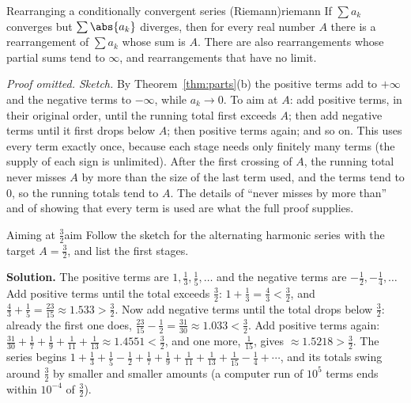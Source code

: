 \documentclass[11pt]{article}
\begin{document}
\begin{thm}{Rearranging a conditionally convergent series (Riemann)}{riemann}
If $\sum a_k$ converges but $\sum\abs{a_k}$ diverges, then for every real number $A$ there is a rearrangement of $\sum a_k$ whose sum is $A$. There are also rearrangements whose partial sums tend to $\infty$, and rearrangements that have no limit.
\end{thm}
\emph{Proof omitted. Sketch.} By Theorem~\ref{thm:parts}(b) the positive terms add to $+\infty$ and the negative terms to $-\infty$, while $a_k\to0$. To aim at $A$: add positive terms, in their original order, until the running total first exceeds $A$; then add negative terms until it first drops below $A$; then positive terms again; and so on. This uses every term exactly once, because each stage needs only finitely many terms (the supply of each sign is unlimited). After the first crossing of $A$, the running total never misses $A$ by more than the size of the last term used, and the terms tend to $0$, so the running totals tend to $A$. The details of ``never misses by more than'' and of showing that every term is used are what the full proof supplies.

\begin{exmp}{Aiming at $\frac32$}{aim}
Follow the sketch for the alternating harmonic series with the target $A=\frac32$, and list the first stages.

\textbf{Solution.} The positive terms are $1,\frac13,\frac15,\dots$ and the negative terms are $-\frac12,-\frac14,\dots$ Add positive terms until the total exceeds $\frac32$: $1+\frac13=\frac43<\frac32$, and $\frac43+\frac15=\frac{23}{15}\approx1.533>\frac32$. Now add negative terms until the total drops below $\frac32$: already the first one does, $\frac{23}{15}-\frac12=\frac{31}{30}\approx1.033<\frac32$. Add positive terms again: $\frac{31}{30}+\frac17+\frac19+\frac1{11}+\frac1{13}\approx1.4551<\frac32$, and one more, $\frac1{15}$, gives $\approx1.5218>\frac32$. The series begins $1+\frac13+\frac15-\frac12+\frac17+\frac19+\frac1{11}+\frac1{13}+\frac1{15}-\frac14+\cdots$, and its totals swing around $\frac32$ by smaller and smaller amounts (a computer run of $10^5$ terms ends within $10^{-4}$ of $\frac32$).
\end{exmp}
\end{document}
